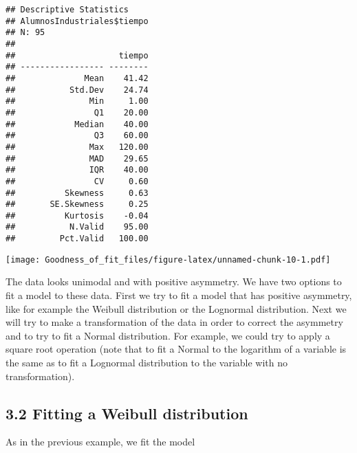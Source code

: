 \documentclass[
]{article}
\newenvironment{Shaded}{\begin{snugshade}}{\end{snugshade}}
\newcommand{\AttributeTok}[1]{\textcolor[rgb]{0.13,0.29,0.53}{#1}}
\newcommand{\CommentTok}[1]{\textcolor[rgb]{0.56,0.35,0.01}{\textit{#1}}}
\newcommand{\ConstantTok}[1]{\textcolor[rgb]{0.56,0.35,0.01}{#1}}
\newcommand{\FunctionTok}[1]{\textcolor[rgb]{0.13,0.29,0.53}{\textbf{#1}}}
\newcommand{\NormalTok}[1]{#1}
\newcommand{\OtherTok}[1]{\textcolor[rgb]{0.56,0.35,0.01}{#1}}
\newcommand{\SpecialCharTok}[1]{\textcolor[rgb]{0.81,0.36,0.00}{\textbf{#1}}}
\newcommand{\StringTok}[1]{\textcolor[rgb]{0.31,0.60,0.02}{#1}}
\begin{document}
\begin{verbatim}
## Descriptive Statistics  
## AlumnosIndustriales$tiempo  
## N: 95  
## 
##                     tiempo
## ----------------- --------
##              Mean    41.42
##           Std.Dev    24.74
##               Min     1.00
##                Q1    20.00
##            Median    40.00
##                Q3    60.00
##               Max   120.00
##               MAD    29.65
##               IQR    40.00
##                CV     0.60
##          Skewness     0.63
##       SE.Skewness     0.25
##          Kurtosis    -0.04
##           N.Valid    95.00
##         Pct.Valid   100.00
\end{verbatim}

\begin{Shaded}
\end{Shaded}

\texttt{[image: Goodness\_of\_fit\_files/figure-latex/unnamed-chunk-10-1.pdf]}

The data looks unimodal and with positive asymmetry. We have two options
to fit a model to these data. First we try to fit a model that has
positive asymmetry, like for example the Weibull distribution or the
Lognormal distribution. Next we will try to make a transformation of the
data in order to correct the asymmetry and to try to fit a Normal
distribution. For example, we could try to apply a square root operation
(note that to fit a Normal to the logarithm of a variable is the same as
to fit a Lognormal distribution to the variable with no transformation).

\hypertarget{fitting-a-weibull-distribution}{%
\subsection{3.2 Fitting a Weibull
distribution}\label{fitting-a-weibull-distribution}}

As in the previous example, we fit the model

\begin{Shaded}
\end{Shaded}
\end{document}
